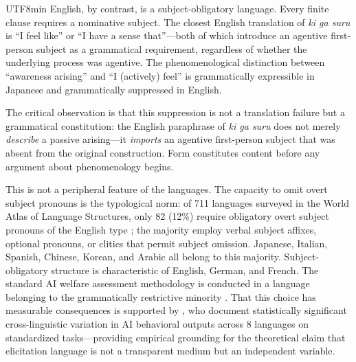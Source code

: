 \documentclass[12pt,a4paper]{article}
\begin{document}
\begin{CJK}{UTF8}{min}
English, by contrast, is a subject-obligatory language. Every finite clause
requires a nominative subject. The closest English translation of \emph{ki ga
suru} is ``I feel like'' or ``I have a sense that''---both of which introduce
an agentive first-person subject as a grammatical requirement, regardless of
whether the underlying process was agentive. The phenomenological distinction
between ``awareness arising'' and ``I (actively) feel'' is grammatically
expressible in Japanese and grammatically suppressed in English.

The critical observation is that this suppression is not a translation failure
but a grammatical constitution: the English paraphrase of \emph{ki ga suru}
does not merely \emph{describe} a passive arising---it \emph{imports} an
agentive first-person subject that was absent from the original construction.
Form constitutes content before any argument about phenomenology begins.

This is not a peripheral feature of the languages. The capacity to omit overt
subject pronouns is the typological norm: of 711 languages surveyed in the
World Atlas of Language Structures, only 82 (12\%) require obligatory overt
subject pronouns of the English type \citep{wals2013}; the majority employ
verbal subject affixes, optional pronouns, or clitics that permit subject
omission. Japanese, Italian, Spanish, Chinese, Korean, and Arabic all belong
to this majority. Subject-obligatory structure is characteristic of English,
German, and French. The standard AI welfare assessment methodology is conducted
in a language belonging to the grammatically restrictive minority
\citep{wals2013,sapir1929,whorf1956}. That
this choice has measurable consequences is supported by
\citet{samway2026crosslingual}, who document statistically significant
cross-linguistic variation in AI behavioral outputs across 8 languages on
standardized tasks---providing empirical grounding for the theoretical claim
that elicitation language is not a transparent medium but an independent
variable.


\end{CJK}
\end{document}
